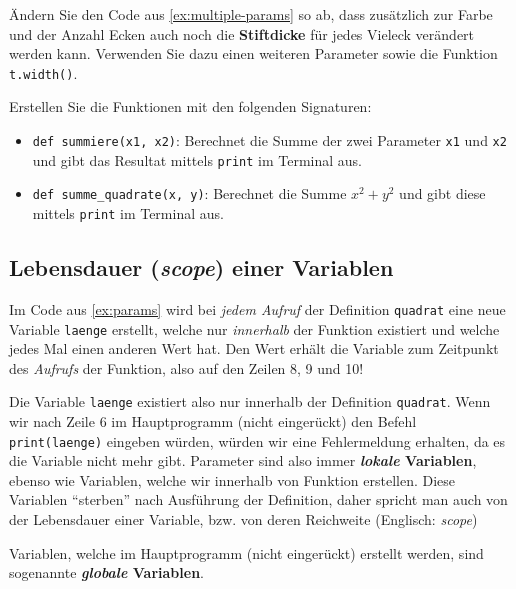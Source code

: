 \begin{myexercise}
	Ändern Sie den Code aus \cref{ex:multiple-params} so ab, dass zusätzlich zur Farbe und der Anzahl Ecken auch noch die \textbf{Stiftdicke} für jedes Vieleck verändert werden kann. Verwenden Sie dazu einen weiteren Parameter sowie die Funktion \lstinline|t.width()|.
\end{myexercise}

\begin{myexercise}
	Erstellen Sie die Funktionen mit den folgenden Signaturen:
	\begin{itemize}
		\item \lstinline|def summiere(x1, x2)|: Berechnet die Summe der zwei Parameter \lstinline|x1| und \lstinline|x2| und gibt das Resultat mittels \lstinline|print| im Terminal aus.
		\item \lstinline|def summe_quadrate(x, y)|: Berechnet die Summe \(x^2 + y^2\) und gibt diese mittels \lstinline{print} im Terminal aus.
	\end{itemize}
\end{myexercise}

\subsection{Lebensdauer (\textit{scope}) einer Variablen}
Im Code aus \cref{ex:params} wird bei \textit{jedem Aufruf} der Definition \lstinline|quadrat| eine neue Variable \texttt{laenge} erstellt, welche nur \textit{innerhalb} der Funktion existiert und welche jedes Mal einen anderen Wert hat. Den Wert erhält die Variable zum Zeitpunkt des \textit{Aufrufs} der Funktion, also auf den Zeilen 8, 9 und 10!

Die Variable \lstinline|laenge| existiert also nur innerhalb der Definition \lstinline|quadrat|. Wenn wir nach Zeile 6 im Hauptprogramm (nicht eingerückt) den Befehl \lstinline|print(laenge)| eingeben würden, würden wir eine Fehlermeldung erhalten, da es die Variable nicht mehr gibt. Parameter sind also immer \textbf{\textit{lokale} Variablen}, ebenso wie Variablen, welche wir innerhalb von Funktion erstellen. Diese Variablen \enquote{sterben} nach Ausführung der Definition, daher spricht man auch von der Lebensdauer einer Variable, bzw. von deren Reichweite (Englisch: \textit{scope})

Variablen, welche im Hauptprogramm (nicht eingerückt) erstellt werden, sind sogenannte \textbf{\textit{globale} Variablen}.

